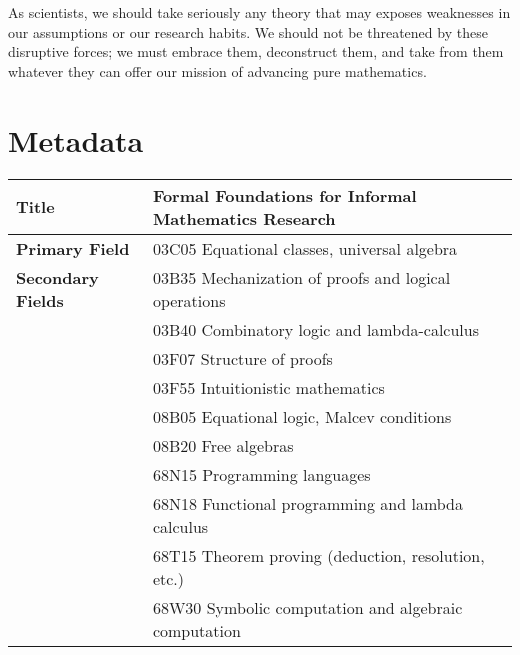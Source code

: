 \documentclass[11pt]{amsart}  %
\begin{document}
As scientists, we should take seriously any theory that may exposes weaknesses in our assumptions or our research habits.  We should not be threatened by these disruptive forces; we must embrace them, deconstruct them, and take from them whatever they can offer our mission of advancing pure mathematics.


\newpage


\appendix

\section{Metadata}



\begin{table}[h]
  \begin{tabular}{|l|l|}
  \hline
  {\bf Title} & Formal Foundations for Informal Mathematics Research \\
  \hline
  {\bf Primary Field} & 03C05 Equational classes, universal algebra\\ %
  \hline
  {\bf Secondary Fields} & 
  03B35 Mechanization of proofs and logical operations\\ %
  & 03B40 Combinatory logic and lambda-calculus\\ %
  & 03F07  Structure of proofs\\
  & 03F55  Intuitionistic mathematics\\
  & 08B05 Equational logic, Malcev conditions\\
  & 08B20  Free algebras\\
  & 68N15  Programming languages\\
  & 68N18  Functional programming and lambda calculus \\ %
  & 68T15  Theorem proving (deduction, resolution, etc.)\\
  & 68W30  Symbolic computation and algebraic computation\\
  \hline
  \end{tabular}
  \end{table}
  
\end{document}
